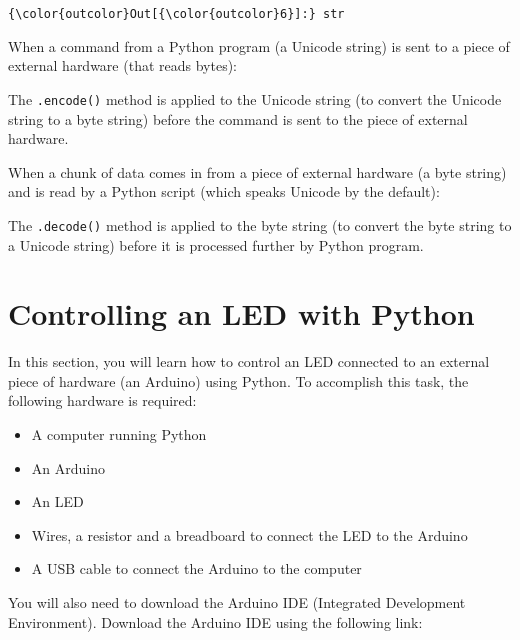 \documentclass{book}
\providecommand{\tightlist}{%
      \setlength{\itemsep}{0pt}\setlength{\parskip}{0pt}}
\newcommand{\passthrough}[1]{#1}
\begin{document}
\begin{Verbatim}[commandchars=\\\{\}]
{\color{outcolor}Out[{\color{outcolor}6}]:} str
\end{Verbatim}
            

    
        When a command from a Python program (a Unicode string) is sent to a
piece of external hardware (that reads bytes):

The \passthrough{\lstinline!.encode()!} method is applied to the Unicode
string (to convert the Unicode string to a byte string) before the
command is sent to the piece of external hardware.

When a chunk of data comes in from a piece of external hardware (a byte
string) and is read by a Python script (which speaks Unicode by the
default):

The \passthrough{\lstinline!.decode()!} method is applied to the byte
string (to convert the byte string to a Unicode string) before it is
processed further by Python program.
    




    
        \hypertarget{controlling-an-led-with-python}{%
\section{Controlling an LED with
Python}\label{controlling-an-led-with-python}}
    




    
        In this section, you will learn how to control an LED connected to an
external piece of hardware (an Arduino) using Python. To accomplish this
task, the following hardware is required:

\begin{itemize}
\tightlist
\item
  A computer running Python
\item
  An Arduino
\item
  An LED
\item
  Wires, a resistor and a breadboard to connect the LED to the Arduino
\item
  A USB cable to connect the Arduino to the computer
\end{itemize}
    




    
        You will also need to download the Arduino IDE (Integrated Development
Environment). Download the Arduino IDE using the following link:
\end{document}
